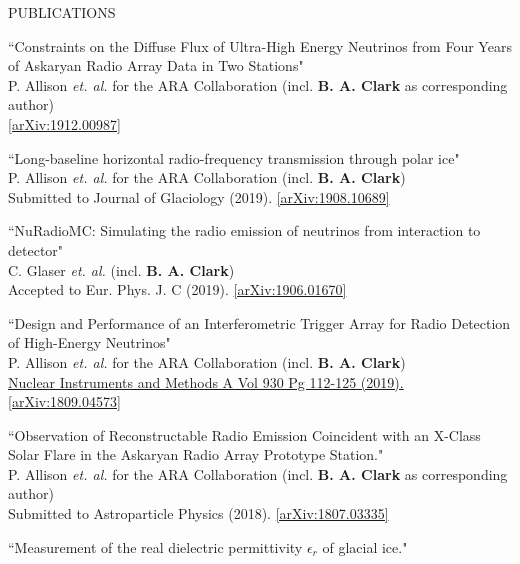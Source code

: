 \documentclass{resume} %
\begin{document}
\begin{rSection}{PUBLICATIONS}
\begin{etaremune}%
  \item ``Constraints on the Diffuse Flux of Ultra-High Energy Neutrinos from Four Years of Askaryan Radio Array Data in Two Stations" \\
 P. Allison {\it et. al.} for the ARA Collaboration (incl. \textbf{B. A. Clark} as corresponding author)\\ \href{https://arxiv.org/abs/1912.00987}{[arXiv:1912.00987]}
  \item ``Long-baseline horizontal radio-frequency transmission through polar ice" \\
 P. Allison {\it et. al.} for the ARA Collaboration (incl. \textbf{B. A. Clark})\\    Submitted to Journal of Glaciology (2019). \href{https://arxiv.org/abs/1908.10689}{[arXiv:1908.10689]}
  \item ``NuRadioMC: Simulating the radio emission of neutrinos from interaction to detector" \\
 C. Glaser {\it et. al.} (incl. \textbf{B. A. Clark})\\    Accepted to Eur. Phys. J. C (2019). \href{https://arxiv.org/abs/1906.01670}{[arXiv:1906.01670]}
  \item ``Design and Performance of an Interferometric Trigger Array for Radio Detection of High-Energy Neutrinos" \\
 P. Allison {\it et. al.} for the ARA Collaboration (incl. \textbf{B. A. Clark}) \\    \href{https://doi.org/10.1016/j.nima.2019.01.067}{Nuclear Instruments and Methods A Vol 930 Pg 112-125 (2019).}  \href{https://arxiv.org/abs/1809.04573}{[arXiv:1809.04573]}
 \item ``Observation of Reconstructable Radio Emission Coincident with an X-Class Solar Flare in the Askaryan Radio Array Prototype Station." \\
 P. Allison {\it et. al.} for the ARA Collaboration (incl. \textbf{B. A. Clark} as corresponding author) \\
 Submitted to Astroparticle Physics (2018). \href{https://arxiv.org/abs/1807.03335}{[arXiv:1807.03335]}
  \item ``Measurement of the real dielectric permittivity $\epsilon_r$ of glacial ice." \\

\end{etaremune}
\end{rSection}
\end{document}
